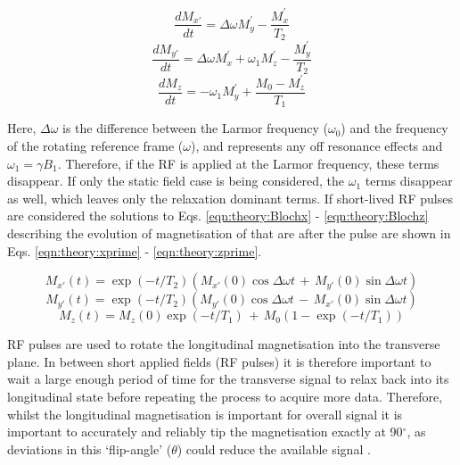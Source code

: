 \begin{equation}
    \frac{dM_{x'}}{dt} = \Delta\omega M_y^{'} - \frac{M_x^{'}}{T_2}
    \label{eqn:theory:Blochx}
\end{equation}
\begin{equation}
    \frac{dM_{y'}}{dt} = \Delta\omega M_x^{'} + \omega_1M_z^{'} - \frac{M_y^{'}}{T_2}
    \label{eqn:theory:Blochy}
\end{equation}
\begin{equation}
    \frac{dM_z}{dt} = -\omega_1M_y^{'} + \frac{M_0-M_z^{'}}{T_1}
    \label{eqn:theory:Blochz}
\end{equation}

Here, $\Delta\omega$ is the difference between the Larmor frequency ($\omega_0$) and the frequency of the rotating reference frame ($\omega$), and represents any off resonance effects and $\omega_1=\gamma B_1$. Therefore, if the \ac{RF} is applied at the Larmor frequency, these terms disappear. If only the static field case is being considered, the $\omega_1$ terms disappear as well, which leaves only the relaxation dominant terms. If short-lived \ac{RF} pulses are considered the solutions to Eqs. \ref{eqn:theory:Blochx} - \ref{eqn:theory:Blochz} describing the evolution of magnetisation of that are after the pulse are shown in Eqs. \ref{eqn:theory:xprime} - \ref{eqn:theory:zprime}.

\begin{equation}
    M_{x'}(t) = \exp(-t/T_2) \left( M_{x'}(0)\cos\Delta\omega t \, + \, M_{y'}(0)\sin\Delta\omega t \right)
    \label{eqn:theory:xprime}
\end{equation}
\begin{equation}
    M_{y'}(t) = \exp(-t/T_2) \left( M_{y'}(0)\cos\Delta\omega t \, - \, M_{x'}(0)\sin\Delta\omega t \right)
\end{equation}
\begin{equation}
    M_z(t) = M_z(0)\exp(-t/T_1) \, + \, M_0 \left( 1-\exp(-t/T_1) \right)
    \label{eqn:theory:zprime}
\end{equation}

RF pulses are used to rotate the longitudinal magnetisation into the transverse plane. In between short applied fields (\ac{RF} pulses) it is therefore important to wait a large enough period of time for the transverse signal to relax back into its longitudinal state before repeating the process to acquire more data. Therefore, whilst the longitudinal magnetisation is important for overall signal it is important to accurately and reliably tip the magnetisation exactly at 90$^\circ$, as deviations in this `flip-angle' ($\theta$) could reduce the available signal \cite{deGraaf2019InSpectroscopy}.

